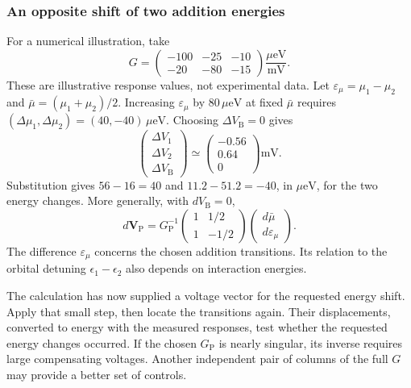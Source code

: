 \subsubsection{An opposite shift of two addition energies}
For a numerical illustration, take
\[
 G=\begin{pmatrix}-100&-25&-10\\-20&-80&-15\end{pmatrix}
       \frac{\mu\mathrm{eV}}{\mathrm{mV}}.
\]
These are illustrative response values, not experimental data.
Let $\varepsilon_\mu=\mu_1-\mu_2$ and
$\bar\mu=(\mu_1+\mu_2)/2$.
Increasing $\varepsilon_\mu$ by $80\,\mu\mathrm{eV}$ at fixed
$\bar\mu$ requires
$(\Delta\mu_1,\Delta\mu_2)=(40,-40)\,\mu\mathrm{eV}$.
Choosing $\Delta V_{\mathrm B}=0$ gives
\begin{equation}
 \begin{pmatrix}\Delta V_1\\\Delta V_2\\\Delta V_{\mathrm B}\end{pmatrix}
 \simeq
 \begin{pmatrix}-0.56\\0.64\\0\end{pmatrix}\mathrm{mV}.
 \label{eq:calibration-two-gate-example}
\end{equation}
Substitution gives $56-16=40$ and $11.2-51.2=-40$,
in $\mu\mathrm{eV}$, for the two energy changes.
More generally, with $dV_{\mathrm B}=0$,
\begin{equation}
 d\mathbf V_{\mathrm P}
 =G_{\mathrm P}^{-1}
   \begin{pmatrix}1&1/2\\1&-1/2\end{pmatrix}
   \begin{pmatrix}d\bar\mu\\d\varepsilon_\mu\end{pmatrix}.
 \label{eq:calibration-common-differential}
\end{equation}
The difference $\varepsilon_\mu$ concerns the chosen addition
transitions. Its relation to the orbital detuning
$\epsilon_1-\epsilon_2$ also depends on interaction energies.

The calculation has now supplied a voltage vector for the requested
energy shift. Apply that small step, then locate the transitions
again. Their displacements, converted to energy with the measured
responses, test whether the requested energy changes occurred.
If the chosen $G_{\mathrm P}$ is nearly singular, its inverse
requires large compensating voltages. Another independent pair
of columns of the full $G$ may provide a better set of controls.

